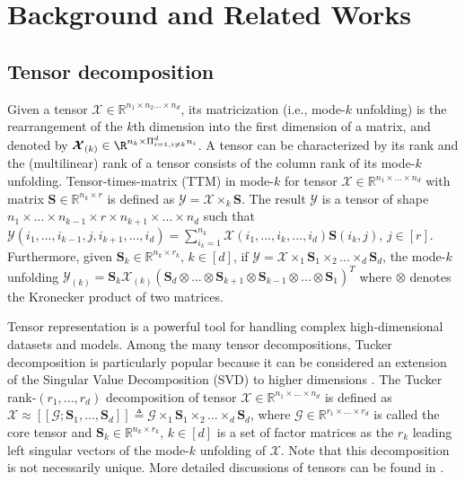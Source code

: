 \section{Background and Related Works}
\subsection{Tensor decomposition}\label{subsection:tensor}
Given a tensor $\boldsymbol{\mathcal{X}} \in \mathbb{R}^{n_1 \times n_2 ... \times n_d}$, its matricization (i.e., mode-$k$ unfolding) is the rearrangement of the $k$th dimension into the first dimension of a matrix, and denoted by $\boldsymbol{\mathcal{X}}_{(k)}\in \R^{n_k \times \Pi_{i=1, i \neq k}^d n_i}$. A tensor can be characterized by its rank and the (multilinear) rank of a tensor consists of the column rank of its mode-$k$ unfolding. Tensor-times-matrix (TTM) in mode-$k$ for tensor $\boldsymbol{\mathcal{X}} \in \mathbb{R}^{n_1 \times ... \times n_d}$ with matrix $\mathbf{S} \in \mathbb{R}^{n_k \times r}$ is defined as $\boldsymbol{\mathcal{Y}} 
 = \boldsymbol{\mathcal{X}} \times_k \mathbf{S}$. The result $\boldsymbol{\mathcal{Y}}$ is a tensor of shape $n_1 \times ... \times n_{k-1} \times r \times n_{k+1} \times ... \times n_d$ such that $\mathcal{Y}(i_1, ..., i_{k-1}, j, i_{k+1}, ..., i_d) = \sum_{i_k = 1}^{n_k} \mathcal{X}(i_1, ..., i_k, ..., i_d) \mathbf{S}(i_k, j)$, $j \in [r]$.
Furthermore, given $\mathbf{S}_k \in \mathbb{R}^{n_k \times r_k}$, $k\in[d]$, if $\boldsymbol{\mathcal{Y}} = \boldsymbol{\mathcal{X}} \times_1 \mathbf{S}_1 \times_2 ... \times_d \mathbf{S}_d$, the mode-$k$ unfolding $
\boldsymbol{\mathcal{Y}}_{(k)} = \mathbf{S}_k \boldsymbol{\mathcal{X}}_{(k)}(\mathbf{S}_d \otimes ... \otimes \mathbf{S}_{k+1}\otimes \mathbf{S}_{k-1} \otimes ... \otimes \mathbf{S}_1)^T
$ where $\otimes$ denotes the Kronecker product of two matrices. 

Tensor representation is a powerful tool for handling complex high-dimensional datasets and models. Among the many tensor decompositions, Tucker decomposition is particularly popular because it can be considered an extension of the Singular Value Decomposition (SVD) to higher dimensions \cite{kolda2009tensor}. 
The Tucker rank-$(r_1, ..., r_d)$ decomposition of tensor $\boldsymbol{\mathcal{X}} \in \mathbb{R}^{n_1 \times ... \times n_d}$ is defined as 
$\boldsymbol{\mathcal{X}} \approx [\![\boldsymbol{\mathcal{G}}; \mathbf{S}_1, ..., \mathbf{S}_d]\!]\triangleq \boldsymbol{\mathcal{G}} \times_1 \mathbf{S}_1 \times_2 ... \times_d \mathbf{S}_d$, where $\boldsymbol{\mathcal{G}} \in \mathbb{R}^{r_1 \times ... \times r_d}$ is called the core tensor and  $\mathbf{S}_k \in \mathbb{R}^{n_k \times r_k}$, $k \in [d]$ is a set of factor matrices as the $r_k$ leading left singular vectors of the mode-$k$ unfolding of $\boldsymbol{\mathcal{X}}$. 
Note that this decomposition is not necessarily unique. More detailed discussions of tensors can be found in \cite{kolda2009tensor}. 

